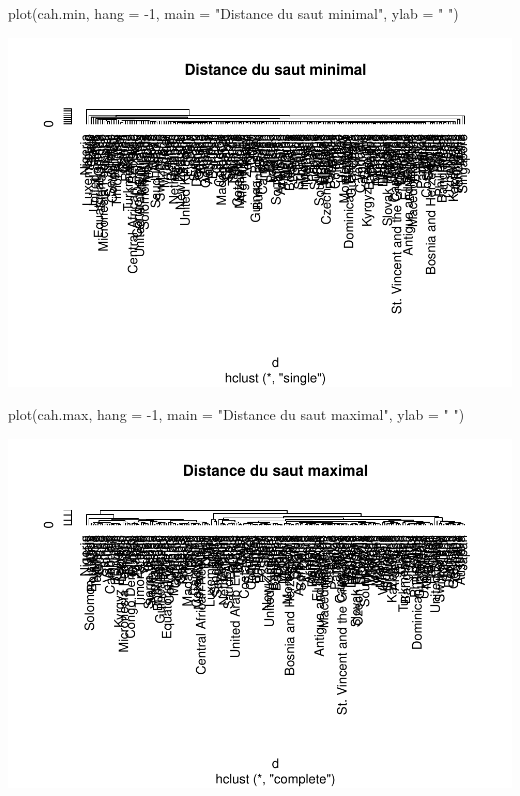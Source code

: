 \documentclass[
]{article}
\newenvironment{Shaded}{}{}
\newcommand{\AttributeTok}[1]{#1}
\newcommand{\DecValTok}[1]{#1}
\newcommand{\FunctionTok}[1]{#1}
\newcommand{\NormalTok}[1]{#1}
\newcommand{\SpecialCharTok}[1]{\textcolor[rgb]{0.00,0.50,0.50}{#1}}
\newcommand{\StringTok}[1]{\textcolor[rgb]{0.00,0.50,0.50}{#1}}
\begin{document}
\begin{Shaded}
\begin{Highlighting}[]
\FunctionTok{plot}\NormalTok{(cah.min, }\AttributeTok{hang =} \SpecialCharTok{{-}}\DecValTok{1}\NormalTok{, }\AttributeTok{main =} \StringTok{"Distance du saut minimal"}\NormalTok{, }\AttributeTok{ylab =} \StringTok{" "}\NormalTok{)}
\end{Highlighting}
\end{Shaded}

\includegraphics{Projet_files/figure-latex/unnamed-chunk-13-1.pdf}

\begin{Shaded}
\begin{Highlighting}[]
\FunctionTok{plot}\NormalTok{(cah.max, }\AttributeTok{hang =} \SpecialCharTok{{-}}\DecValTok{1}\NormalTok{, }\AttributeTok{main =} \StringTok{"Distance du saut maximal"}\NormalTok{, }\AttributeTok{ylab =} \StringTok{" "}\NormalTok{)}
\end{Highlighting}
\end{Shaded}

\includegraphics{Projet_files/figure-latex/unnamed-chunk-14-1.pdf}
\end{document}
